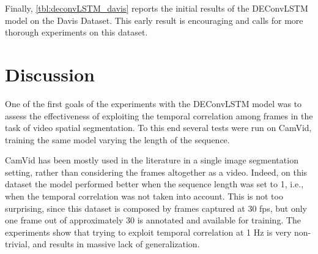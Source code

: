Finally, \autoref{tbl:deconvLSTM_davis} reports the initial results of the
DEConvLSTM model on the Davis Dataset. This early result is encouraging and
calls for more thorough experiments on this dataset.

\begin{table}[t]
    \caption{Results on the Davis dataset. Average Intersection over Union
        (IoU) is reported.}
    \label{tbl:deconvLSTM_davis}
\end{table}


\section{Discussion}\label{sec:deconvLSTM_discussion}
One of the first goals of the experiments with the DEConvLSTM model was to
assess the effectiveness of exploiting the temporal correlation among frames in
the task of video spatial segmentation. To this end several tests were run on
CamVid, training the same model varying the length of the sequence.

CamVid has been mostly used in the literature in a single image
segmentation setting, rather than considering the frames altogether as a video.
Indeed, on this dataset the model performed better when the sequence length was
set to 1, i.e., when the temporal correlation was not taken into account.
This is not too surprising, since this dataset is composed by frames captured
at 30 fps, but only one frame out of approximately 30 is annotated and available
for training. The experiments show that trying to exploit temporal correlation
at 1 Hz is very non-trivial, and results in massive lack of generalization.

